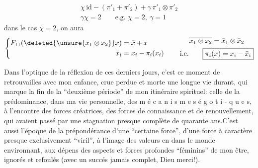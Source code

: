 \[
 \boxed{\begin{gathered}
 \chi\,\mathrm{id}-(\pi'_1+\pi'_2)+\gamma\,\pi'_1\otimes\pi'_2\\
 \gamma\chi=2\qquad\text{e.g. }\chi=2,\ \gamma=1
 \end{gathered}}
\]
dans le cas $\chi=2$, on aura
\[
 \left\{\begin{aligned}
 F_{11}(\deleted{\unsure{x_1\otimes x_2}}x)&=\bar x+x\\
 \bar x_i&=x_i-\pi_i(x_i)
 \end{aligned}\right.
 \qquad
 \begin{gathered}
 \overline{x_1\otimes x_2}=\bar x_1\otimes\bar x_2\\
 \text{i.e.}\qquad \boxed{\pi_i(x)=x_i-\bar x_i}
 \end{gathered}
\]





Dans l'optique de la réflexion de ces derniers jours, c'est ce moment de retrouvailles avec mon enfance, crue perdue et morte une longue vie durant, qui marque la fin de la ``deuxième période'' de mon itinéraire spirituel: celle de la prédominance, dans ma vie personnelle, des m é c a n i s m e s é g o t i - q u e s, à l'encontre des forces créatrices, des forces de connaissance et de renouvellement, qui avaient passé par une stagnation presque complète de quarante ans.C'est aussi l'époque de la prépondérance d'une ``certaine force'', d'une force à caractère presque exclusivement ``viril'', à l'image des valeurs en  dans le monde environnant, aux dépens des aspects et forces profondes ``féminins'' de mon être, ignorés et refoulés (avec un succés jamais complet, Dieu merci!).

